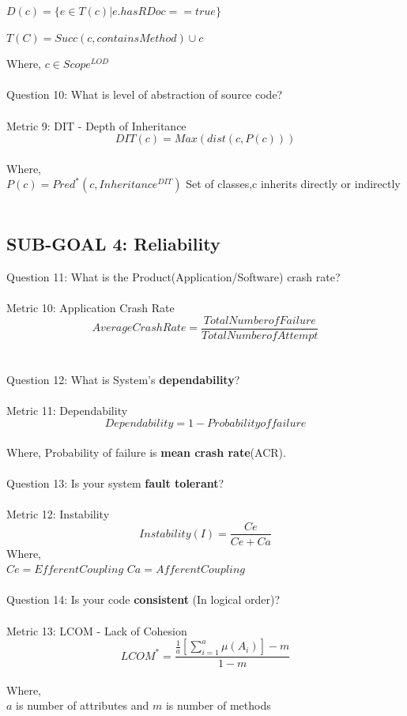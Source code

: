 \documentclass[a4paper, 11pt]{article}
\begin{document}
 $D(c) = \{ e \in T(c) |e.has RDoc == true\}$
 
 
 $T(C) = Succ(c, containsMethod) \cup c$
 
 Where, $c \in Scope^{LOD}$\\ \\
Question 10: What is level of abstraction of source code?\\ \\
Metric 9: DIT - Depth of Inheritance\cite{9}
\begin{equation*}
    DIT(c) = Max(dist(c,P(c)))    
 \end{equation*}\\
 Where,\\
 $P(c) = Pred^*(c,Inheritance^{DIT})$ Set of classes,c inherits directly or indirectly\\ \\

\subsection{SUB-GOAL 4: Reliability}
Question 11: What is the Product(Application/Software) crash rate?\\ \\
Metric 10: Application Crash Rate\cite{13}
\begin{equation*}
    Average Crash Rate = \frac{Total Number of Failure}{Total Number of Attempt}
\end{equation*}\\ \\
Question 12: What is System’s \textbf{dependability}? \\ \\
Metric 11: Dependability\cite{14} 
\begin{equation*}
     Dependability = 1 - Probability  of failure
 \end{equation*}\\
 Where, Probability of failure is \textbf{mean crash rate}(ACR).\\ \\
Question 13: Is your system \textbf{fault tolerant}?\\ \\ 
Metric 12: Instability\cite{8}
 \begin{equation*}
     Instability(I) = \frac{Ce}{Ce+Ca}
 \end{equation*}
 Where,\\ 
 
 $Ce = Efferent Coupling$
 $Ca = Afferent Coupling$ \\ \\
Question 14: Is your code \textbf{consistent} (In logical order)? \\ \\
Metric 13: LCOM - Lack of Cohesion\cite{8}
 \begin{equation*}
     LCOM^* = \frac{\frac{1}{a}[\sum_{i=1}^{a}\mu(A_i)]-m}{1-m}
 \end{equation*}\\
 Where,\\
 $a$ is number of attributes and $m$ is number of methods\\ \\
\end{document}
